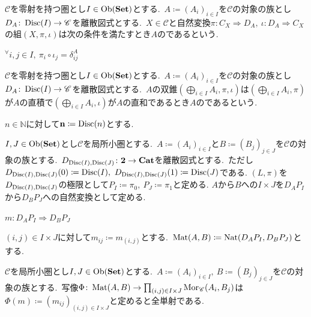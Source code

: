 \begin{definition} \label{def: IsBicone}
$\mathscr{C}$を零射を持つ圏とし$I \in \operatorname{Ob}(\mathbf{Set})$とする.\
$A \coloneq (A_i)_{i \in I}$を$\mathscr{C}$の対象の族とし$D_A \colon \operatorname{Disc}(I) \to \mathscr{C}$を離散図式とする.\
$X \in \mathscr{C}$と自然変換$\pi \colon C_X \Rightarrow D_A,\ \iota \colon D_A \Rightarrow C_X$の組$(X, \pi, \iota)$は次の条件を満たすとき$A$のであるという.
\begin{center}
	${^{\forall}i,j} \in I,\ \pi_i \circ \iota_j = \delta_{ij}^A$
\end{center}
\end{definition}

\begin{definition} \label{def: Family.IsBiproduct}
$\mathscr{C}$を零射を持つ圏とし$I \in \operatorname{Ob}(\mathbf{Set})$とする.\
$A \coloneq (A_i)_{i \in I}$を$\mathscr{C}$の対象の族とし$D_A \colon \operatorname{Disc}(I) \to \mathscr{C}$を離散図式とする.\
$A$の双錐$(\bigoplus_{i \in I} A_i, \pi, \iota)$は$(\bigoplus_{i \in I} A_i, \pi)$が$A$の直積で$(\bigoplus_{i \in I} A_i, \iota)$が$A$の直和であるとき$A$のであるという.
\end{definition}

\begin{remark} \label{rem: finite_discrete_category}
$n \in \mathbb{N}$に対して$\mathbf{n} \coloneq \operatorname{Disc}(n)$とする.
\end{remark}

\begin{definition} \label{def: matrix}
$I, J \in \operatorname{Ob}(\mathbf{Set})$とし$\mathscr{C}$を局所小圏とする.\
$A \coloneq (A_i)_{i \in I}$と$B \coloneq (B_j)_{j \in J}$を$\mathscr{C}$の対象の族とする.\ 
$D_{\operatorname{Disc}(I), \operatorname{Disc}(J)} \colon \mathbf{2} \to \mathbf{Cat}$を離散図式とする.\
ただし$D_{\Disc(I), \Disc(J)}(0) \coloneq \Disc(I),\ D_{\Disc(I), \Disc(J)}(1) \coloneq \Disc(J)$である.
$(L, \pi)$を$D_{\operatorname{Disc}(I), \operatorname{Disc}(J)}$の極限として$P_I \coloneq \pi_0,\ P_J \coloneq \pi_1$と定める.
$A$から$B$への$I \times J$を$D_A P_I$から$D_B P_J$への自然変換として定める.
\begin{center}
$m \colon D_A P_I \Rightarrow D_B P_J$
\end{center}
$(i,j) \in I \times J$に対して$m_{ij} \coloneq m_{(i,j)}$とする.\
$\operatorname{Mat}(A,B) \coloneq \operatorname{Nat}(D_A P_I, D_B P_J)$とする.
\end{definition}

\begin{proposition} \label{prop: matrix_entries_bijective}
$\mathscr{C}$を局所小圏とし$I,J \in \operatorname{Ob}(\mathbf{Set})$とする.\
$A \coloneq (A_i)_{i \in I},\ B \coloneq (B_j)_{j \in J}$を$\mathscr{C}$の対象の族とする.\
写像$\Phi \colon \operatorname{Mat}(A,B) \to \prod_{(i,j) \in I \times J} \operatorname{Mor}_{\mathscr{C}}(A_i,B_j)$は$\Phi(m) \coloneq (m_{ij})_{(i,j) \in I \times J}$と定めると全単射である.
\end{proposition}


